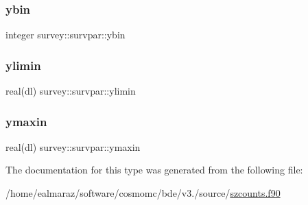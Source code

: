 \mbox{\label{structsurvey_1_1survpar_a046b77768edd065a143e4afe98220fc1}} 
\subsubsection{\texorpdfstring{ybin}{ybin}}
{\footnotesize\ttfamily integer survey\+::survpar\+::ybin}

\mbox{\label{structsurvey_1_1survpar_a45db02ad2a9d12c01434408d59dbabdd}} 
\subsubsection{\texorpdfstring{ylimin}{ylimin}}
{\footnotesize\ttfamily real(dl) survey\+::survpar\+::ylimin}

\mbox{\label{structsurvey_1_1survpar_a2ff5bdc3dd4c47b0438c235f069e888b}} 
\subsubsection{\texorpdfstring{ymaxin}{ymaxin}}
{\footnotesize\ttfamily real(dl) survey\+::survpar\+::ymaxin}



The documentation for this type was generated from the following file\+:\begin{DoxyCompactItemize}
\item 
/home/ealmaraz/software/cosmomc/bde/v3./source/\mbox{\hyperlink{szcounts_8f90}{szcounts.\+f90}}\end{DoxyCompactItemize}
